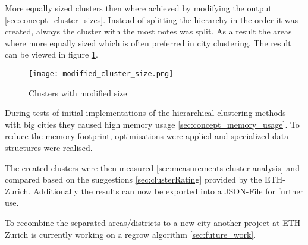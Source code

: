 More equally sized clusters then where achieved by modifying the output \ref{sec:concept_cluster_sizes}. Instead of splitting the hierarchy in the order it was created, always the cluster with the most notes was split. As a result the areas where more equally sized which is often preferred in city clustering. The result can be viewed in figure  \ref{fig:cluster_with_mod_sizes}.

\begin{figure}[ht]
    \centering
    \begin{mdframed}[style=mdthight, userdefinedwidth=0.4\linewidth, align=center]
        \texttt{[image: modified\_cluster\_size.png]}
    \end{mdframed}
    \caption{Clusters with modified size}
    \label{fig:cluster_with_mod_sizes}
\end{figure}

During tests of initial implementations of the hierarchical clustering methods with big cities they caused high memory usage \ref{sec:concept_memory_usage}. To reduce the memory footprint, optimisations were applied and specialized data structures were realised.

The created clusters were then measured \ref{sec:measurements-cluster-analysis} and compared based on the suggestions \ref{sec:clusterRating} provided by the ETH-Zurich. Additionally the results can now be exported into a JSON-File for further use.

To recombine the separated areas/districts to a new city another project at ETH-Zurich is currently working on a regrow algorithm \ref{sec:future_work}. 
